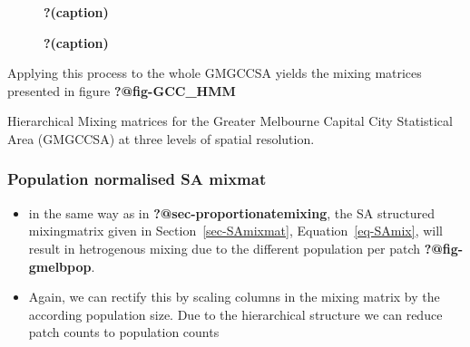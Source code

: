 \documentclass[
  letterpaper,
  DIV=11,
  numbers=noendperiod]{scrartcl}
\begin{document}
\begin{figure}

\begin{minipage}[t]{0.50\linewidth}

{\centering 


\caption{\label{fig-GMelb_eg-1}\textbf{?(caption)}}

}

\end{minipage}%
%
\begin{minipage}[t]{0.50\linewidth}

{\centering 


\caption{\label{fig-GMelb_eg-2}\textbf{?(caption)}}

}

\end{minipage}%

\end{figure}

Applying this process to the whole GMGCCSA yields the mixing matrices
presented in figure \textbf{?@fig-GCC\_HMM}

\begin{figure}

\end{figure}

Hierarchical Mixing matrices for the Greater Melbourne Capital City
Statistical Area (GMGCCSA) at three levels of spatial resolution.

\hypertarget{population-normalised-sa-mixmat}{%
\subsubsection{Population normalised SA
mixmat}\label{population-normalised-sa-mixmat}}

\begin{figure}

\end{figure}

\begin{itemize}
\item
  in the same way as in \textbf{?@sec-proportionatemixing}, the SA
  structured mixingmatrix given in Section~\ref{sec-SAmixmat},
  Equation~\ref{eq-SAmix}, will result in hetrogenous mixing due to the
  different population per patch \textbf{?@fig-gmelbpop}.
\item
  Again, we can rectify this by scaling columns in the mixing matrix by
  the according population size. Due to the hierarchical structure we
  can reduce patch counts to population counts
\end{itemize}
\end{document}
